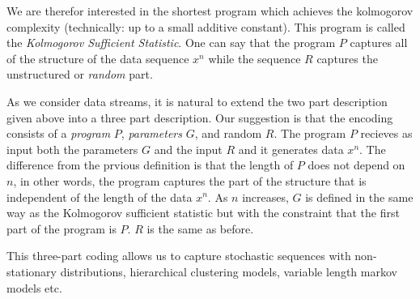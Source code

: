 \documentclass[11pt]{article}
\begin{document}
We are therefor interested in the shortest program which achieves the
kolmogorov complexity (technically: up to a small additive constant).
This program is called the {\em Kolmogorov Sufficient Statistic}. One
can say that the program $P$ captures all of the structure of the data
sequence $x^n$ while the sequence $R$ captures the unstructured or
{\em random} part.

As we consider data streams, it is natural to extend the two part
description given above into a three part description. Our suggestion
is that the encoding consists of a {\em program} $P$, {\em parameters}
$G$, and random $R$. The program $P$ recieves as input both the
parameters $G$ and the input $R$ and it generates data $x^n$. The
difference from the prvious definition is that the length of $P$ does
not depend on $n$, in other words, the program captures the part of
the structure that is independent of the length of the data $x^n$. As
$n$ increases, $G$ is defined in the same way as the Kolmogorov
sufficient statistic but with the constraint that the first part of
the program is $P$. $R$ is the same as before.

This three-part coding allows us to capture stochastic sequences with
non-stationary distributions, hierarchical clustering models, variable
length markov models etc.
\end{document}
